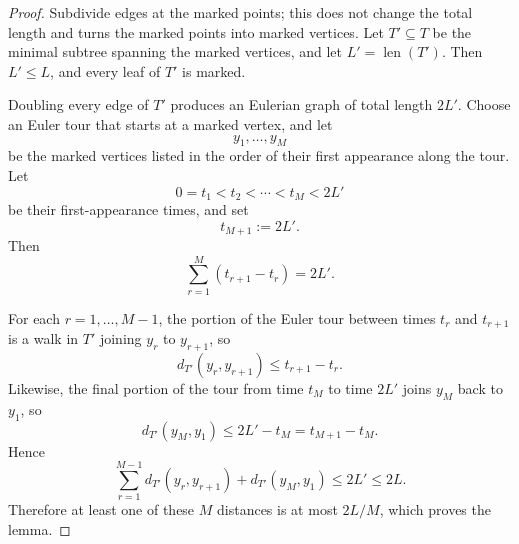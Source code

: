 \documentclass[12pt]{amsart}
\DeclareMathOperator{\len}{len}
\theoremstyle{definition}
\theoremstyle{remark}
\begin{document}
\begin{proof}
Subdivide edges at the marked points; this does not change the total length and
turns the marked points into marked vertices. Let $T'\subseteq T$ be the minimal
subtree spanning the marked vertices, and let $L'=\len(T')$. Then $L'\le L$,
and every leaf of $T'$ is marked.

Doubling every edge of $T'$ produces an Eulerian graph of total length $2L'$.
Choose an Euler tour that starts at a marked vertex, and let
\[
y_1,\dots,y_M
\]
be the marked vertices listed in the order of their first appearance along the
tour. Let
\[
0=t_1<t_2<\cdots<t_M<2L'
\]
be their first-appearance times, and set
\[
t_{M+1}:=2L'.
\]
Then
\[
\sum_{r=1}^M (t_{r+1}-t_r)=2L'.
\]

For each $r=1,\dots,M-1$, the portion of the Euler tour between times $t_r$ and
$t_{r+1}$ is a walk in $T'$ joining $y_r$ to $y_{r+1}$, so
\[
d_{T'}(y_r,y_{r+1})\le t_{r+1}-t_r.
\]
Likewise, the final portion of the tour from time $t_M$ to time $2L'$ joins
$y_M$ back to $y_1$, so
\[
d_{T'}(y_M,y_1)\le 2L'-t_M=t_{M+1}-t_M.
\]
Hence
\[
\sum_{r=1}^{M-1} d_{T'}(y_r,y_{r+1}) + d_{T'}(y_M,y_1)
\le 2L' \le 2L.
\]
Therefore at least one of these $M$ distances is at most $2L/M$, which proves
the lemma.
\end{proof}
\end{document}
